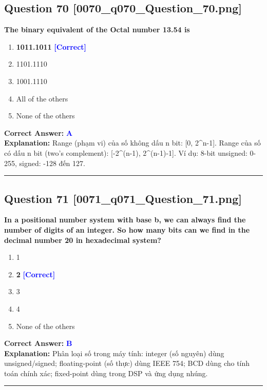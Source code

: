 \documentclass[11pt,a4paper]{article}
\begin{document}
\begin{minipage}{\textwidth}
\subsection*{Question 70 \quad \footnotesize{[0070\_q070\_Question\_70.png]}}
\noindent \textbf{The binary equivalent of the Octal number 13.54 is}

\begin{enumerate}[label=\Alph*.]
    \item \textbf{1011.1011} \hfill \textcolor{blue}{\textbf{[Correct]}}
    \item 1101.1110
    \item 1001.1110
    \item All of the others
    \item None of the others
\end{enumerate}

\noindent \textbf{Correct Answer:} \textcolor{blue}{\textbf{A}} \\[2pt]
\noindent \textbf{Explanation:} Range (phạm vi) của số không dấu n bit: [0, 2\textasciicircum{}n-1]. Range của số có dấu n bit (two's complement): [-2\textasciicircum{}(n-1), 2\textasciicircum{}(n-1)-1]. Ví dụ: 8-bit unsigned: 0-255, signed: -128 đến 127.

\par\vspace{0.3cm}
\hrule
\vspace{0.3cm}
\end{minipage}

\begin{minipage}{\textwidth}
\subsection*{Question 71 \quad \footnotesize{[0071\_q071\_Question\_71.png]}}
\noindent \textbf{In a positional number system with base b, we can always find the number of digits of an integer. So how many bits can we find in the decimal number 20 in hexadecimal system?}

\begin{enumerate}[label=\Alph*.]
    \item 1
    \item \textbf{2} \hfill \textcolor{blue}{\textbf{[Correct]}}
    \item 3
    \item 4
    \item None of the others
\end{enumerate}

\noindent \textbf{Correct Answer:} \textcolor{blue}{\textbf{B}} \\[2pt]
\noindent \textbf{Explanation:} Phân loại số trong máy tính: integer (số nguyên) dùng unsigned/signed; floating-point (số thực) dùng IEEE 754; BCD dùng cho tính toán chính xác; fixed-point dùng trong DSP và ứng dụng nhúng.

\par\vspace{0.3cm}
\hrule
\vspace{0.3cm}
\end{minipage}
\end{document}
